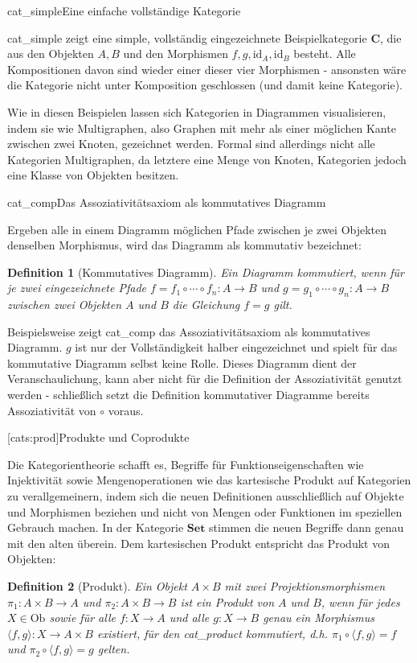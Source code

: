 \documentclass[11pt, a4paper, bibgerm]{scrbook}
\newcommand\lsection{}
\newcommand\abb{}
\newcommand\fig{}
\newcommand\ato{\rightarrow} %
\newtheorem{defini}{Definition}
\newcommand{\defi}[2]{%
  \begin{defini}[#1]
    \label{def:#1}
    #2
  \end{defini}
}
\begin{document}
\fig{cat_simple}{Eine einfache vollständige Kategorie}

\abb{cat_simple} zeigt eine simple, vollständig eingezeichnete
Beispielkategorie $\mathbf{C}$, die aus den Objekten $A, B$ und den
Morphismen $f, g, \mathrm{id}_A, \mathrm{id}_B$ besteht. Alle
Kompositionen davon sind wieder einer dieser vier Morphismen - ansonsten
wäre die Kategorie nicht unter Komposition geschlossen (und damit keine
Kategorie).

Wie in diesen Beispielen lassen sich Kategorien in Diagrammen
visualisieren, indem sie wie Multigraphen, also Graphen mit mehr als
einer möglichen Kante zwischen zwei Knoten, gezeichnet werden. Formal
sind allerdings nicht alle Kategorien Multigraphen, da letztere eine
Menge von Knoten, Kategorien jedoch eine Klasse von Objekten besitzen.

\fig{cat_comp}{Das Assoziativitätsaxiom als kommutatives Diagramm}

Ergeben alle in einem Diagramm möglichen Pfade zwischen je zwei Objekten
denselben Morphismus, wird das Diagramm als kommutativ bezeichnet:
\defi{Kommutatives Diagramm}{ Ein Diagramm kommutiert, wenn für je zwei
  eingezeichnete Pfade $f=f_1 \circ \cdots \circ f_n : A \rightarrow B$
  und $g=g_1 \circ \cdots \circ g_n : A \rightarrow B$ zwischen zwei
  Objekten $A$ und $B$ die Gleichung $f=g$ gilt.  }
Beispielsweise zeigt \abb{cat_comp} das Assoziativitätsaxiom als
kommutatives Diagramm. $g$ ist nur der Vollständigkeit halber
eingezeichnet und spielt für das kommutative Diagramm selbst keine
Rolle. Dieses Diagramm dient der Veranschaulichung, kann aber nicht für
die Definition der Assoziativität genutzt werden - schließlich setzt die
Definition kommutativer Diagramme bereits Assoziativität von $\circ$
voraus.

\lsection[cats:prod]{Produkte und Coprodukte}

Die Kategorientheorie schafft es, Begriffe für Funktionseigenschaften
wie Injektivität sowie Mengenoperationen wie das kartesische Produkt auf
Kategorien zu verallgemeinern, indem sich die neuen Definitionen
ausschließlich auf Objekte und Morphismen beziehen und nicht von Mengen
oder Funktionen im speziellen Gebrauch machen. In der Kategorie
$\mathbf{Set}$ stimmen die neuen Begriffe dann genau mit den alten
überein. Dem kartesischen Produkt entspricht das Produkt von Objekten:

\defi{Produkt}{ Ein Objekt $A \times B$ mit zwei Projektionsmorphismen
  $\pi_1 : A \times B \ato A$ und $\pi_2 : A \times B \ato B$ ist ein
  Produkt von $A$ und $B$, wenn für jedes $X \in \mathrm{Ob}$ sowie für
  alle $f : X \ato A$ und alle $g : X \ato B$ genau ein Morphismus
  $\langle f,g \rangle : X \ato A \times B$ existiert, für den
  \abb{cat_product} kommutiert, d.h.  $\pi_1 \circ \langle f,g \rangle =
  f$ und $\pi_2 \circ \langle f,g \rangle = g$ gelten.  }
\end{document}

